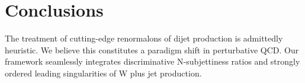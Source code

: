 \section{Conclusions}\label{sec:conclusions}

The treatment of cutting-edge renormalons of dijet production is
admittedly heuristic. We believe this constitutes a paradigm shift in
perturbative QCD. Our framework seamlessly integrates discriminative
N-subjettiness ratios and strongly ordered leading singularities of W
plus jet production.

